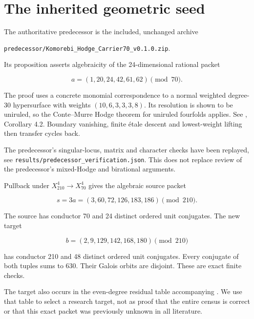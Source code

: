 \hypertarget{transfer210-the-inherited-geometric-seed}{%
\section{The inherited geometric
seed}\label{transfer210-the-inherited-geometric-seed}}

The authoritative predecessor is the included, unchanged archive

\texttt{predecessor/Komorebi\_Hodge\_Carrier70\_v0.1.0.zip}.

Its proposition asserts algebraicity of the 24-dimensional rational
packet

\begin{equation}\label{eq:transfer210-4.1}
a=(1,20,24,42,61,62)\pmod {70}.\end{equation}

The proof uses a concrete monomial correspondence to a normal weighted
degree-30 hypersurface with weights \((10,6,3,3,3,8)\). Its resolution
is shown to be uniruled, so the Conte--Murre Hodge theorem for uniruled
fourfolds applies. See \cite{ArapuraUniruled}, Corollary 4.2. Boundary
vanishing, finite étale descent and lowest-weight lifting then transfer
cycles back.

The predecessor's singular-locus, matrix and character checks have been
replayed, see \texttt{results/predecessor\_verification.json}. This does
not replace review of the predecessor's mixed-Hodge and birational
arguments.

Pullback under \(X_{210}^4\to X_{70}^4\) gives the algebraic source
packet

\begin{equation}\label{eq:transfer210-4.2}
s=3a=(3,60,72,126,183,186)\pmod {210}.\end{equation}

The source has conductor 70 and 24 distinct ordered unit conjugates. The
new target

\begin{equation}\label{eq:transfer210-4.3}
b=(2,9,129,142,168,180)\pmod {210}\end{equation}

has conductor 210 and 48 distinct ordered unit conjugates. Every
conjugate of both tuples sums to 630. Their Galois orbits are disjoint.
These are exact finite checks.

The target also occurs in the even-degree residual table accompanying
\cite{Jumagulov2026}. We use that table to select a research target, not
as proof that the entire census is correct or that this exact packet was
previously unknown in all literature.

